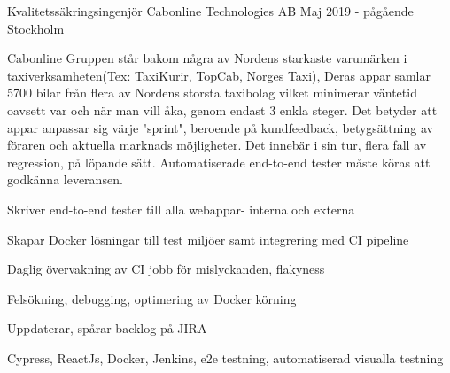 \documentclass[12pt, a4paper]{awesome-cv}
\begin{document}
  \begin{cventries}
    \cventry
      {Kvalitetssäkringsingenjör}
      {Cabonline Technologies AB}
      {Maj 2019 - pågående}
      {Stockholm}
      {
        \justify
        Cabonline Gruppen står bakom några av Nordens starkaste varumärken i taxiverksamheten(Tex: TaxiKurir, TopCab, Norges Taxi),
        Deras appar samlar 5700 bilar från flera av Nordens storsta taxibolag vilket minimerar väntetid oavsett var och när man vill åka,
        genom endast 3 enkla steger. Det betyder att appar anpassar sig värje "sprint", beroende på kundfeedback, betygsättning av föraren
        och aktuella marknads möjligheter. Det innebär i sin tur, flera fall av regression, på löpande sätt. Automatiserade end-to-end tester måste
        köras att godkänna leveransen.
        \hfill \break
        \hfill \break
        \begin{cvitems}
          \item Skriver end-to-end tester till alla webappar- interna och externa
          \item Skapar Docker lösningar till test miljöer samt integrering med CI pipeline
          \item Daglig övervakning av CI jobb för mislyckanden, flakyness
          \item Felsökning, debugging, optimering av Docker körning
          \item Uppdaterar, spårar backlog på JIRA
          \item Cypress, ReactJs, Docker, Jenkins, e2e testning, automatiserad visualla testning
        \end{cvitems}
      }


\end{cventries}
\end{document}
